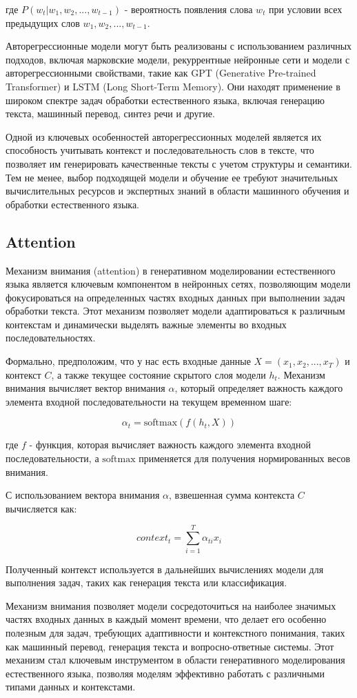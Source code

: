 где \( P(w_t|w_1, w_2, ..., w_{t-1}) \) - вероятность появления слова \( w_t \) при условии всех предыдущих слов \( w_1, w_2, ..., w_{t-1} \).

Авторегрессионные модели могут быть реализованы с использованием различных подходов, включая марковские модели, рекуррентные нейронные сети и модели с авторегрессионными свойствами, такие как GPT (Generative Pre-trained Transformer) и LSTM (Long Short-Term Memory). Они находят применение в широком спектре задач обработки естественного языка, включая генерацию текста, машинный перевод, синтез речи и другие.

Одной из ключевых особенностей авторегрессионных моделей является их способность учитывать контекст и последовательность слов в тексте, что позволяет им генерировать качественные тексты с учетом структуры и семантики. Тем не менее, выбор подходящей модели и обучение ее требуют значительных вычислительных ресурсов и экспертных знаний в области машинного обучения и обработки естественного языка.

\subsection{Attention}

Механизм внимания (attention) в генеративном моделировании естественного языка является ключевым компонентом в нейронных сетях, позволяющим модели фокусироваться на определенных частях входных данных при выполнении задач обработки текста. Этот механизм позволяет модели адаптироваться к различным контекстам и динамически выделять важные элементы во входных последовательностях.

Формально, предположим, что у нас есть входные данные \( X = (x_1, x_2, ..., x_T) \) и контекст \( C \), а также текущее состояние скрытого слоя модели \( h_t \). Механизм внимания вычисляет вектор внимания \( \alpha \), который определяет важность каждого элемента входной последовательности на текущем временном шаге:

\[ \alpha_t = \text{softmax}(f(h_t, X)) \]

где \( f \) - функция, которая вычисляет важность каждого элемента входной последовательности, а \( \text{softmax} \) применяется для получения нормированных весов внимания.

С использованием вектора внимания \( \alpha \), взвешенная сумма контекста \( C \) вычисляется как:

\[ context_t = \sum_{i=1}^{T} \alpha_{ti} x_i \]

Полученный контекст используется в дальнейших вычислениях модели для выполнения задач, таких как генерация текста или классификация.

Механизм внимания позволяет модели сосредоточиться на наиболее значимых частях входных данных в каждый момент времени, что делает его особенно полезным для задач, требующих адаптивности и контекстного понимания, таких как машинный перевод, генерация текста и вопросно-ответные системы. Этот механизм стал ключевым инструментом в области генеративного моделирования естественного языка, позволяя моделям эффективно работать с различными типами данных и контекстами.

